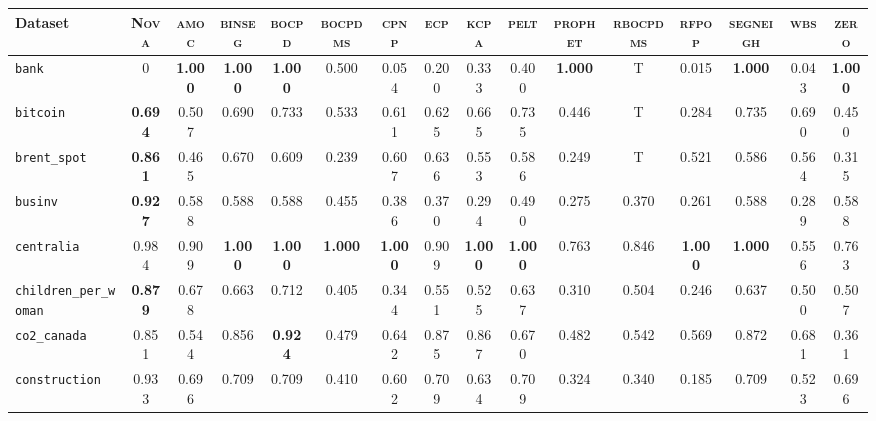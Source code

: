 \begin{table*}[h!]
\begin{adjustbox}{width=\textwidth}
    \begin{tabular}{l|c|cccccccccccccc}
    Dataset & \textsc{Nova} & \textsc{amoc} & \textsc{binseg} & \textsc{bocpd} & \textsc{bocpdms} & \textsc{cpnp} & \textsc{ecp} & \textsc{kcpa} & \textsc{pelt} & \textsc{prophet} & \textsc{rbocpdms} & \textsc{rfpop} & \textsc{segneigh} & \textsc{wbs} & \textsc{zero}\\
    \hline
    \cellcolor{gray!100}\verb+bank+ & \cellcolor{gray!100}0 & \cellcolor{gray!100}\textbf{1.000} & \cellcolor{gray!100}\textbf{1.000} & \cellcolor{gray!100}\textbf{1.000} & \cellcolor{gray!100}0.500 & \cellcolor{gray!100}0.054 & \cellcolor{gray!100}0.200 & \cellcolor{gray!100}0.333 & \cellcolor{gray!100}0.400 & \cellcolor{gray!100}\textbf{1.000} & \cellcolor{gray!100}T & \cellcolor{gray!100}0.015 & \cellcolor{gray!100}\textbf{1.000} & \cellcolor{gray!100}0.043 & \cellcolor{gray!100}\textbf{1.000}\\
    \verb+bitcoin+ & \cellcolor{SeaGreen!04}\textbf{0.694} & 0.507 & 0.690 & 0.733 & 0.533 & 0.611 & 0.625 & 0.665 & 0.735 & 0.446 & T & 0.284 & 0.735 & 0.690 & 0.450\\
    \verb+brent_spot+ & \cellcolor{blue!20}\textbf{0.861} & 0.465 & 0.670 & 0.609 & 0.239 & 0.607 & 0.636 & 0.553 & 0.586 & 0.249 & T & 0.521 & 0.586 & 0.564 & 0.315\\
    \verb+businv+ & \cellcolor{blue!40}\textbf{0.927} & 0.588 & 0.588 & 0.588 & 0.455 & 0.386 & 0.370 & 0.294 & 0.490 & 0.275 & 0.370 & 0.261 & 0.588 & 0.289 & 0.588\\
    \verb+centralia+ & \cellcolor{SeaGreen!01}0.984 & 0.909 & \textbf{1.000} & \textbf{1.000} & \textbf{1.000} & \textbf{1.000} & 0.909 & \textbf{1.000} & \textbf{1.000} & 0.763 & 0.846 & \textbf{1.000} & \textbf{1.000} & 0.556 & 0.763\\
    \verb+children_per_woman+ & \cellcolor{blue!16}\textbf{0.879} & 0.678 & 0.663 & 0.712 & 0.405 & 0.344 & 0.551 & 0.525 & 0.637 & 0.310 & 0.504 & 0.246 & 0.637 & 0.500 & 0.507\\
    
    \verb+co2_canada+ & \cellcolor{SeaGreen!07}0.851 & 0.544 & 0.856 & \textbf{0.924} & 0.479 & 0.642 & 0.875 & 0.867 & 0.670 & 0.482 & 0.542 & 0.569 & 0.872 & 0.681 & 0.361\\
    
    \verb+construction+ & \cellcolor{blue!23}0.933 & 0.696 & 0.709 & 0.709 & 0.410 & 0.602 & 0.709 & 0.634 & 0.709 & 0.324 & 0.340 & 0.185 & 0.709 & 0.523 & 0.696\\
    

\end{tabular}
\end{adjustbox}
\end{table*}
